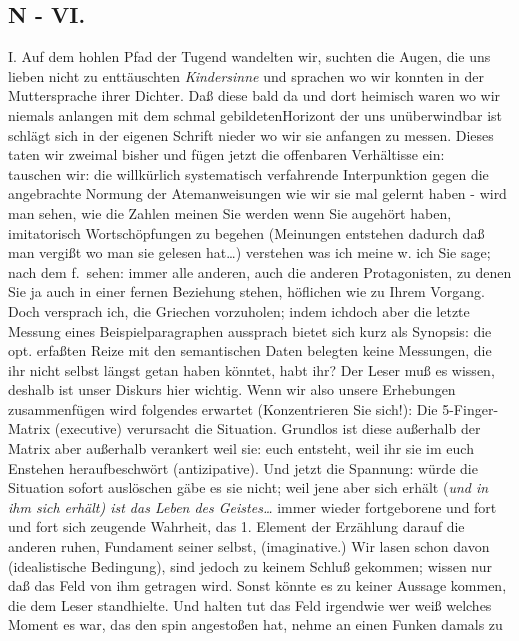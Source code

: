 \documentclass[
]{article}
\author{}
\date{\vspace{-2.5em}}
\begin{document}
\subsection{N - VI.}\label{n---vi.}

I. Auf dem hohlen Pfad der Tugend wandelten wir, suchten die Augen, die
uns lieben nicht zu enttäuschten \emph{Kindersinne} und sprachen wo wir
konnten in der Muttersprache ihrer Dichter. Daß diese bald da und dort
heimisch waren wo wir niemals anlangen mit dem schmal gebildetenHorizont
der uns unüberwindbar ist schlägt sich in der eigenen Schrift nieder wo
wir sie anfangen zu messen. Dieses taten wir zweimal bisher und fügen
jetzt die offenbaren Verhältisse ein:\\
tauschen wir: die willkürlich systematisch verfahrende Interpunktion
gegen die angebrachte Normung der Atemanweisungen wie wir sie mal
gelernt haben - wird man sehen, wie die Zahlen meinen Sie werden wenn
Sie augehört haben, imitatorisch Wortschöpfungen zu begehen (Meinungen
entstehen dadurch daß man vergißt wo man sie gelesen hat\ldots)
verstehen was ich meine w. ich Sie sage; nach dem f.~sehen: immer alle
anderen, auch die anderen Protagonisten, zu denen Sie ja auch in einer
fernen Beziehung stehen, höflichen wie zu Ihrem Vorgang. Doch versprach
ich, die Griechen vorzuholen; indem ichdoch aber die letzte Messung
eines Beispielparagraphen aussprach bietet sich kurz als Synopsis: die
opt. erfaßten Reize mit den semantischen Daten belegten keine Messungen,
die ihr nicht selbst längst getan haben könntet, habt ihr? Der Leser muß
es wissen, deshalb ist unser Diskurs hier wichtig. Wenn wir also unsere
Erhebungen zusammenfügen wird folgendes erwartet (Konzentrieren Sie
sich!): Die 5-Finger-Matrix (executive) verursacht die Situation.
Grundlos ist diese außerhalb der Matrix aber außerhalb verankert weil
sie: euch entsteht, weil ihr sie im euch Enstehen heraufbeschwört
(antizipative). Und jetzt die Spannung: würde die Situation sofort
auslöschen gäbe es sie nicht; weil jene aber sich erhält (\emph{und in
ihm sich erhält) ist das Leben des Geistes\ldots{}} immer wieder
fortgeborene und fort und fort sich zeugende Wahrheit, das 1. Element
der Erzählung darauf die anderen ruhen, Fundament seiner selbst,
(imaginative.) Wir lasen schon davon (idealistische Bedingung), sind
jedoch zu keinem Schluß gekommen; wissen nur daß das Feld von ihm
getragen wird. Sonst könnte es zu keiner Aussage kommen, die dem Leser
standhielte. Und halten tut das Feld irgendwie wer weiß welches Moment
es war, das den spin angestoßen hat, nehme an einen Funken damals zu
\end{document}
